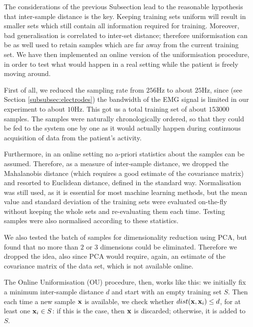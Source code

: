The considerations of the previous Subsection lead to the reasonable
hypothesis that inter-sample distance is the key. Keeping training
sets uniform will result in smaller sets which still contain all
information required for training. Moreover, bad generalisation is
correlated to inter-set distance; therefore uniformisation can be as
well used to retain samples which are far away from the current
training set. We have then implemented an online version of the
uniformisation procedure, in order to test what would happen in a real
setting while the patient is freely moving around.

First of all, we reduced the sampling rate from $256$Hz to about
$25$Hz, since (see Section \ref{subsubsec:electrodes}) the bandwidth
of the EMG signal is limited in our experiment to about $10$Hz. This
got us a total training set of about $153000$ samples. The samples
were naturally chronologically ordered, so that they could be fed to
the system one by one as it would actually happen during continuous
acquisition of data from the patient's activity.

Furthermore, in an online setting no a-priori statistics about the
samples can be assumed. Therefore, as a measure of inter-sample
distance, we dropped the Mahalanobis distance (which requires a good
estimate of the covariance matrix) and resorted to Euclidean distance,
defined in the standard way. Normalisation was still used, as it is
essential for most machine learning methods, but the mean value and
standard deviation of the training sets were evaluated on-the-fly
without keeping the whole sets and re-evaluating them each
time. Testing samples were also normalised according to these
statistics.

We also tested the batch of samples for dimensionality reduction using
PCA, but found that no more than $2$ or $3$ dimensions could be
eliminated. Therefore we dropped the idea, also since PCA would
require, again, an estimate of the covariance matrix of the data set,
which is not available online.

The Online Uniformisation (OU) procedure, then, works like this: we
initially fix a minimum inter-sample distance $d$ and start
with an empty training set $S$. Then each time a new sample $\mathbf{x}$ is
available, we check whether $dist(\mathbf{x},\mathbf{x}_i)\leq d$, for at
least one $\mathbf{x}_i \in S$: if this is the case, then $\mathbf{x}$ is discarded;
otherwise, it is added to $S$.

